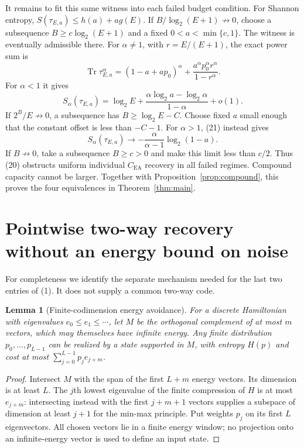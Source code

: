 \documentclass[11pt]{article}
\newtheorem{lemma}[theorem]{Lemma}
\newcommand{\Tr}{\operatorname{Tr}}
\newcommand{\CEA}{C_{\mathrm{EA}}}
\begin{document}
It remains to fit this same witness into each failed budget condition.
For Shannon entropy,
\(S(\tau_{E,a})\le h(a)+ag(E)\).
If \(B/\log_2(E+1)\not\to0\), choose a subsequence
\(B\ge c\log_2(E+1)\) and a fixed \(0<a<\min\{c,1\}\).
The witness is eventually admissible there.
For \(\alpha\ne1\), with \(r=E/(E+1)\), the exact power sum is
\[
 \Tr\tau_{E,a}^\alpha
 =(1-a+ap_0)^\alpha+
       \frac{a^\alpha p_0^\alpha r^\alpha}{1-r^\alpha}.         \tag{21}
\]
For \(\alpha<1\) it gives
\[
 S_\alpha(\tau_{E,a})
 =\log_2E+\frac{\alpha\log_2a-\log_2\alpha}{1-\alpha}+o(1).
\]
If \(2^B/E\not\to0\), a subsequence has \(B\ge\log_2E-C\).
Choose fixed \(a\) small enough that the constant offset is less than
\(-C-1\). For \(\alpha>1\), (21) instead gives
\[
 S_\alpha(\tau_{E,a})\longrightarrow
            -\frac{\alpha}{\alpha-1}\log_2(1-a).
\]
If \(B\not\to0\), take a subsequence \(B\ge c>0\) and make this limit
less than \(c/2\).
Thus (20) obstructs uniform individual \(\CEA\) recovery in all failed
regimes. Compound capacity cannot be larger.
Together with Proposition~\ref{prop:compound}, this proves the four
equivalences in Theorem~\ref{thm:main}.

\section{Pointwise two-way recovery without an energy bound on noise}
For completeness we identify the separate mechanism needed for the
last two entries of (1). It does not supply a common two-way code.

\begin{lemma}[Finite-codimension energy avoidance]\label{lem:minmax}
For a discrete Hamiltonian with eigenvalues
\(e_0\le e_1\le\cdots\), let \(M\) be the orthogonal complement of at
most \(m\) vectors, which may themselves have infinite energy.
Any finite distribution \(p_0,\ldots,p_{L-1}\) can be realized by a
state supported in \(M\), with entropy \(H(p)\) and cost at most
\(\sum_{j=0}^{L-1}p_je_{j+m}\).
\end{lemma}
\begin{proof}
Intersect \(M\) with the span of the first \(L+m\) energy vectors.
Its dimension is at least \(L\). The \(j\)th lowest eigenvalue of the
finite compression of \(H\) is at most \(e_{j+m}\): intersecting
instead with the first \(j+m+1\) vectors supplies a subspace of
dimension at least \(j+1\) for the min-max principle.
Put weights \(p_j\) on its first \(L\) eigenvectors.
All chosen vectors lie in a finite energy window; no projection onto
an infinite-energy vector is used to define an input state.
\end{proof}
\end{document}
